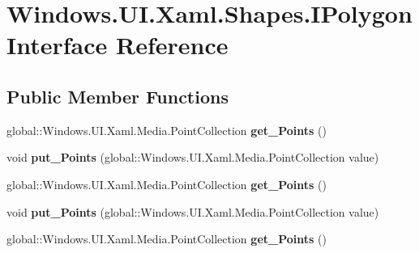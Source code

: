 \hypertarget{interface_windows_1_1_u_i_1_1_xaml_1_1_shapes_1_1_i_polygon}{}\section{Windows.\+U\+I.\+Xaml.\+Shapes.\+I\+Polygon Interface Reference}
\label{interface_windows_1_1_u_i_1_1_xaml_1_1_shapes_1_1_i_polygon}
\subsection*{Public Member Functions}
\begin{DoxyCompactItemize}
\item 
\mbox{\label{interface_windows_1_1_u_i_1_1_xaml_1_1_shapes_1_1_i_polygon_a53564a340ab3f6f90c8fa9e62a58c5da}} 
global\+::\+Windows.\+U\+I.\+Xaml.\+Media.\+Point\+Collection {\bfseries get\+\_\+\+Points} ()
\item 
\mbox{\label{interface_windows_1_1_u_i_1_1_xaml_1_1_shapes_1_1_i_polygon_aff4656dda579146484457971ae043261}} 
void {\bfseries put\+\_\+\+Points} (global\+::\+Windows.\+U\+I.\+Xaml.\+Media.\+Point\+Collection value)
\item 
\mbox{\label{interface_windows_1_1_u_i_1_1_xaml_1_1_shapes_1_1_i_polygon_a53564a340ab3f6f90c8fa9e62a58c5da}} 
global\+::\+Windows.\+U\+I.\+Xaml.\+Media.\+Point\+Collection {\bfseries get\+\_\+\+Points} ()
\item 
\mbox{\label{interface_windows_1_1_u_i_1_1_xaml_1_1_shapes_1_1_i_polygon_aff4656dda579146484457971ae043261}} 
void {\bfseries put\+\_\+\+Points} (global\+::\+Windows.\+U\+I.\+Xaml.\+Media.\+Point\+Collection value)
\item 
\mbox{\label{interface_windows_1_1_u_i_1_1_xaml_1_1_shapes_1_1_i_polygon_a53564a340ab3f6f90c8fa9e62a58c5da}} 
global\+::\+Windows.\+U\+I.\+Xaml.\+Media.\+Point\+Collection {\bfseries get\+\_\+\+Points} ()
\item 

\end{DoxyCompactItemize}
